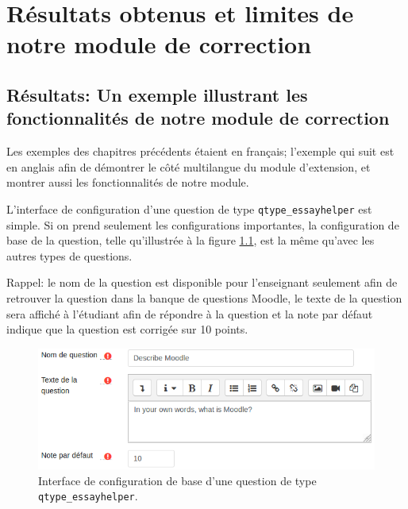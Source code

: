 \chapter{R\'esultats obtenus et limites de notre module de correction}

\section{R\'esultats: Un exemple illustrant les fonctionnalit\'es de notre module de correction}

Les exemples des chapitres pr\'ec\'edents \'etaient en fran\c{c}ais; l'exemple qui suit est en anglais afin de d\'emontrer le c\^ot\'e multilangue du module d'extension, et montrer aussi les fonctionnalit\'es de notre module.

L'interface de configuration d'une question de type \texttt{qtype\_essayhelper} est simple.
Si on prend seulement les configurations importantes, la configuration de base de la question, telle qu'illustr\'ee \`a la figure \ref{questionform_base}, est la m\^eme qu'avec les autres types de questions.

Rappel: le nom de la question est disponible pour l'enseignant seulement afin de retrouver la question dans la banque de questions Moodle, le texte de la question sera affich\'e \`a l'\'etudiant afin de r\'epondre \`a la question et la note par d\'efaut indique que la question est corrig\'ee sur 10 points.
\begin{figure}[htbp]
  \includegraphics[scale=0.85]{images/questionform_base.png}
  \caption{Interface de configuration de base d'une question de type \texttt{qtype\_essayhelper}.}
  \label{questionform_base}
\end{figure}

